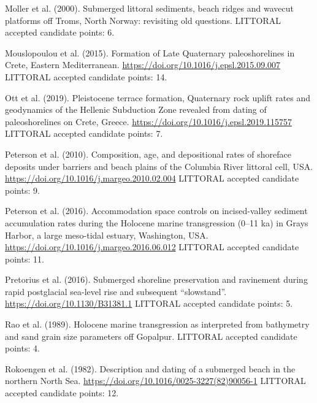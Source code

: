 \documentclass[twocolumn,10pt]{article}
\begin{document}
\begin{thebibliography}{}
Moller et al. (2000).
\newblock Submerged littoral sediments, beach ridges and wavecut platforms off Troms, North Norway: revisiting old questions.
\newblock LITTORAL accepted candidate points: 6.

Mouslopoulou et al. (2015).
\newblock Formation of Late Quaternary paleoshorelines in Crete, Eastern Mediterranean.
\newblock \url{https://doi.org/10.1016/j.epsl.2015.09.007}
\newblock LITTORAL accepted candidate points: 14.

Ott et al. (2019).
\newblock Pleistocene terrace formation, Quaternary rock uplift rates and geodynamics of the Hellenic Subduction Zone revealed from dating of paleoshorelines on Crete, Greece.
\newblock \url{https://doi.org/10.1016/j.epsl.2019.115757}
\newblock LITTORAL accepted candidate points: 7.

Peterson et al. (2010).
\newblock Composition, age, and depositional rates of shoreface deposits under barriers and beach plains of the Columbia River littoral cell, USA.
\newblock \url{https://doi.org/10.1016/j.margeo.2010.02.004}
\newblock LITTORAL accepted candidate points: 9.

Peterson et al. (2016).
\newblock Accommodation space controls on incised-valley sediment accumulation rates during the Holocene marine transgression (0–11 ka) in Grays Harbor, a large meso-tidal estuary, Washington, USA.
\newblock \url{https://doi.org/10.1016/j.margeo.2016.06.012}
\newblock LITTORAL accepted candidate points: 11.

Pretorius et al. (2016).
\newblock Submerged shoreline preservation and ravinement during rapid postglacial sea-level rise and subsequent “slowstand”.
\newblock \url{https://doi.org/10.1130/B31381.1}
\newblock LITTORAL accepted candidate points: 5.

Rao et al. (1989).
\newblock Holocene marine transgression as interpreted from bathymetry and sand grain size parameters off Gopalpur.
\newblock LITTORAL accepted candidate points: 4.

Rokoengen et al. (1982).
\newblock Description and dating of a submerged beach in the northern North Sea.
\newblock \url{https://doi.org/10.1016/0025-3227(82)90056-1}
\newblock LITTORAL accepted candidate points: 12.


\end{thebibliography}
\end{document}
